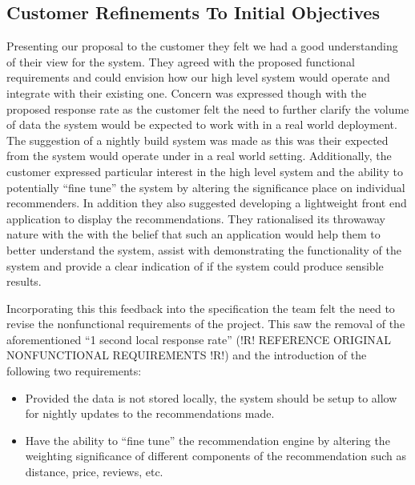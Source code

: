 \documentclass{l3proj}
\begin{document}

\subsection{Customer Refinements To Initial Objectives}
\label{custrefineinitobj}

Presenting our proposal to the customer they felt we had a good understanding of their view for the system. They agreed with the proposed functional requirements and could envision how our high level system would operate and integrate with their existing one. Concern was expressed though with the proposed response rate as the customer felt the need to further clarify the volume of data the system would be expected to work with in a real world deployment. The suggestion of a nightly build system was made as this was their expected from the system would operate under in a real world setting. Additionally, the customer expressed particular interest in the high level system and the ability to potentially “fine tune” the system by altering the significance place on individual recommenders. In addition they also suggested developing a lightweight front end application to display the recommendations. They rationalised its throwaway nature with the with the belief that such an application would help them to better understand the system, assist with demonstrating the functionality of the system and provide a clear indication of if the system could produce sensible results. 

Incorporating this this feedback into the specification  the team felt the need to revise the nonfunctional requirements of the project. This saw the removal of the aforementioned “1 second local response rate” (!R! REFERENCE ORIGINAL NONFUNCTIONAL REQUIREMENTS !R!) and the introduction of the following two requirements:

\begin{itemize}
\item Provided the data is not stored locally, the system should be setup to allow for nightly updates to the recommendations made.
\item Have the ability to “fine tune” the recommendation engine by altering the weighting significance of different components of the recommendation such as distance, price, 
reviews, etc.
\end{itemize}
\end{document}
